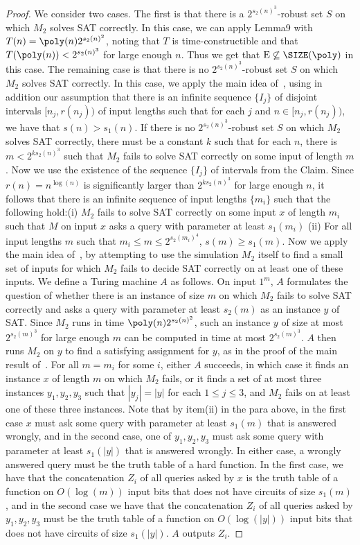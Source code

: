 \begin{proof}
We consider two cases. The first is that there is a $2^{s_2(n)^3}$-robust set $S$ on which $M_2$ solves SAT correctly. In this case, we can apply Lemma9 with $T(n)=\poly(n)2^{s_2(n)^2}$, noting that $T$ is time-constructible and that $T(\poly(n))<2^{s_2(n)^3}$ for large enough $n$. Thus we get that $\mathrm E\not\subseteq\SIZE(\poly)$ in this case.
The remaining case is that there is no $2^{s_2(n)^3}$-robust set $S$ on which $M_2$ solves SAT correctly. In this case, we apply the main idea of~\cite{ref12}, using in addition our assumption that there is an infinite sequence $\{I_j\}$ of disjoint intervals $[n_j,r(n_j))$ of input lengths such that for each $j$ and $n\in[n_j,r(n_j))$, we have that $s(n)>s_1(n)$.
If there is no $2^{s_2(n)^3}$-robust set $S$ on which $M_2$ solves SAT correctly, there must be a constant $k$ such that for each $n$, there is $m<2^{ks_2(n)^3}$ such that $M_2$ fails to solve SAT correctly on some input of length $m$. Now we use the existence of the sequence $\{I_j\}$ of intervals from the Claim. Since $r(n)=n^{\log(n)}$ is significantly larger than $2^{ks_2(n)^3}$ for large enough $n$, it follows that there is an infinite sequence of input lengths $\{m_i\}$ such that the following hold:(i) $M_2$ fails to solve SAT correctly on some input $x$ of length $m_i$ such that $M$ on input $x$ asks a query with parameter at least $s_1(m_i)$ (ii) For all input lengths $m$ such that $m_i\leq m\leq2^{s_2(m_i)^4}$, $s(m)\geq s_1(m)$.
Now we apply the main idea of~\cite{ref12}, by attempting to use the simulation $M_2$ itself to find a small set of inputs for which $M_2$ fails to decide SAT correctly on at least one of these inputs. We define a Turing machine $A$ as follows. On input $1^m$, $A$ formulates the question of whether there is an instance of size $m$ on which $M_2$ fails to solve SAT correctly and asks a query with parameter at least $s_2(m)$ as an instance $y$ of SAT. Since $M_2$ runs in time $\poly(n)2^{s_2(n)^2}$, such an instance $y$ of size at most $2^{s_2(m)^3}$ for large enough $m$ can be computed in time at most $2^{s_2(m)^3}$. $A$ then runs $M_2$ on $y$ to find a satisfying assignment for $y$, as in the proof of the main result of~\cite{ref12}. For all $m=m_i$ for some $i$, either $A$ succeeds, in which case it finds an instance $x$ of length $m$ on which $M_2$ fails, or it finds a set of at most three instances $y_1,y_2,y_3$ such that $|y_j|=|y|$ for each $1\leq j\leq3$, and $M_2$ fails on at least one of these three instances. Note that by item(ii) in the para above, in the first case $x$ must ask some query with parameter at least $s_1(m)$ that is answered wrongly, and in the second case, one of $y_1,y_2,y_3$ must ask some query with parameter at least $s_1(|y|)$ that is answered wrongly. In either case, a wrongly answered query must be the truth table of a hard function. In the first case, we have that the concatenation $Z_i$ of all queries asked by $x$ is the truth table of a function on $O(\log(m))$ input bits that does not have circuits of size $s_1(m)$, and in the second case we have that the concatenation $Z_i$ of all queries asked by $y_1,y_2,y_3$ must be the truth table of a function on $O(\log(|y|))$ input bits that does not have circuits of size $s_1(|y|)$. $A$ outputs $Z_i$.

\end{proof}
